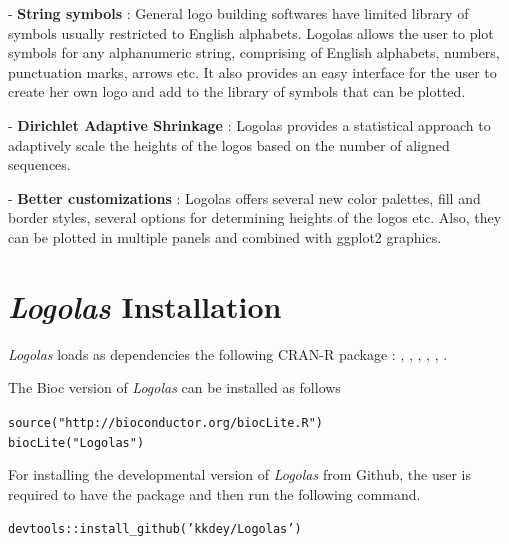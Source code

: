 \documentclass[12pt]{article}\usepackage[]{graphicx}\usepackage[usenames,dvipsnames]{color}
\newcommand{\hlstr}[1]{\textcolor[rgb]{0.251,0.627,0.251}{#1}}%
\newcommand{\hlopt}[1]{\textcolor[rgb]{0,0,0}{#1}}%
\newcommand{\hlstd}[1]{\textcolor[rgb]{0.251,0.251,0.251}{#1}}%
\newcommand{\hlkwd}[1]{\textcolor[rgb]{0.878,0.439,0.125}{#1}}%
\newenvironment{knitrout}{}{} %
\newcommand{\Logolas}{\textit{Logolas}}
\begin{document}
- \textbf{String symbols} : General logo building softwares have limited library of symbols usually restricted to English alphabets. Logolas allows the user to plot symbols for any alphanumeric string, comprising of English alphabets, numbers, punctuation marks, arrows etc. It also provides an easy interface for the user to create her own logo and add to the library of symbols that can be plotted.

- \textbf{Dirichlet Adaptive Shrinkage} : Logolas provides a statistical approach to adaptively scale the heights of the logos based on the number of aligned sequences.

- \textbf{Better customizations} : Logolas offers several new color palettes, fill and border styles, several options for determining heights of the logos etc. Also, they can be plotted in multiple panels and combined with ggplot2 graphics.


\newpage

\section{\Logolas{} Installation}

\Logolas{} loads as dependencies the following CRAN-R package : , , ,  , , .

The Bioc version of \Logolas{} can be installed as follows

\begin{knitrout}
\color{fgcolor}\begin{kframe}
\begin{alltt}
\hlkwd{source}\hlstd{(}\hlstr{"http://bioconductor.org/biocLite.R"}\hlstd{)}
\hlkwd{biocLite}\hlstd{(}\hlstr{"Logolas"}\hlstd{)}
\end{alltt}
\end{kframe}
\end{knitrout}

For installing the developmental version of \Logolas{} from Github, the user is required to have the  package and then run the following command.

\begin{knitrout}
\color{fgcolor}\begin{kframe}
\begin{alltt}
\hlstd{devtools}\hlopt{::}\hlkwd{install_github}\hlstd{(}\hlstr{'kkdey/Logolas'}\hlstd{)}
\end{alltt}
\end{kframe}
\end{knitrout}
\end{document}
